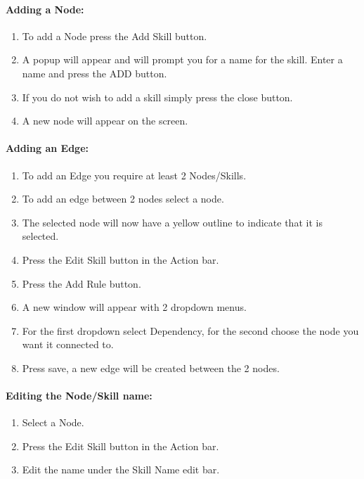 \documentclass[12pt]{article}
\begin{document}
\paragraph{Adding a Node:}

\begin{enumerate}
	\item To add a Node press the Add Skill button.
	\item A popup will appear and will prompt you for a name for the skill. Enter a name and press the ADD button.
	\item If you do not wish to add a skill simply press the close button.
	\item A new node will appear on the screen.
\end{enumerate}

\paragraph{Adding an Edge:}

\begin{enumerate}
	\item To add an Edge you require at least 2 Nodes/Skills.
	\item To add an edge between 2 nodes select a node.
	\item The selected node will now have a yellow outline to indicate that it is selected.
	\item Press the Edit Skill button in the Action bar.
	\item Press the Add Rule button.
	\item A new window will appear with 2 dropdown menus.
	\item For the first dropdown select Dependency, for the second choose the node you want it connected to.
	\item Press save, a new edge will be created between the 2 nodes.
\end{enumerate}

\paragraph{Editing the Node/Skill name:}
\begin{enumerate}
	\item Select a Node.
	\item Press the Edit Skill button in the Action bar.
	\item Edit the name under the Skill Name edit bar.
\end{enumerate}
\end{document}
